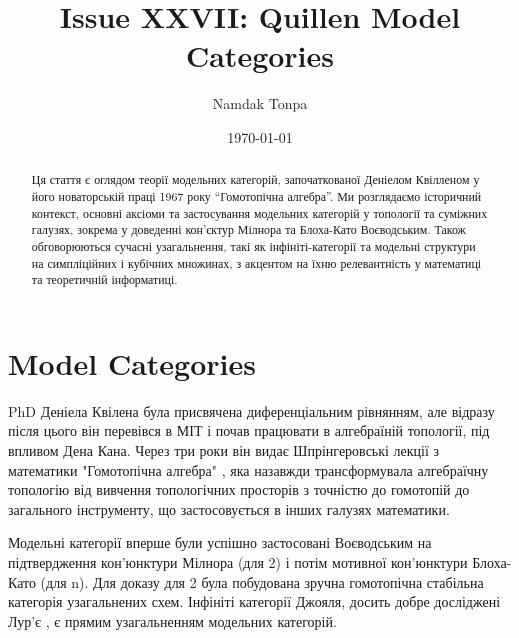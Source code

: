 \documentclass[12pt]{article}
\theoremstyle{plain}
\theoremstyle{definition}
\theoremstyle{remark}
\begin{document}
\title{Issue XXVII: Quillen Model Categories}
\author{Namdak Tonpa}
\date{\today}

\maketitle

\begin{abstract}
Ця стаття є оглядом теорії модельних категорій, започаткованої Деніелом Квілленом у його новаторській праці 1967 року ``Гомотопічна алгебра''. Ми розглядаємо історичний контекст, основні аксіоми та застосування модельних категорій у топології та суміжних галузях, зокрема у доведенні кон’єктур Мілнора та Блоха-Като Воєводським. Також обговорюються сучасні узагальнення, такі як інфініті-категорії та модельні структури на симпліційних і кубічних множинах, з акцентом на їхню релевантність у математиці та теоретичній інформатиці.
\end{abstract}

\ifincludeTOC
  \tableofcontents
\fi


\section{Model Categories}
PhD Деніела Квілена була присвячена диференціальним рівнянням, але відразу після цього він перевівся в МІТ і почав працювати в алгебраїній топології, під впливом Дена Кана. Через три роки він видає Шпрінгеровські лекції з математики "Гомотопічна алгебра" \cite{Quillen67}, яка назавжди трансформувала алгебраїчну топологію від вивчення топологічних просторів з точністю до гомотопій до загального інструменту, що застосовується в інших галузях математики.

Модельні категорії вперше були успішно застосовані Воєводським на підтвердження кон'юнктури Мілнора \cite{Voevodsky96} (для 2) і потім мотивної кон'юнктури Блоха-Като \cite{Voevodsky03} (для n). Для доказу для 2 була побудована зручна гомотопічна стабільна категорія узагальнених схем. Інфініті категорії Джояля, досить добре досліджені Лур'є \cite{Lurie09}, є прямим узагальненням модельних категорій.
\end{document}
